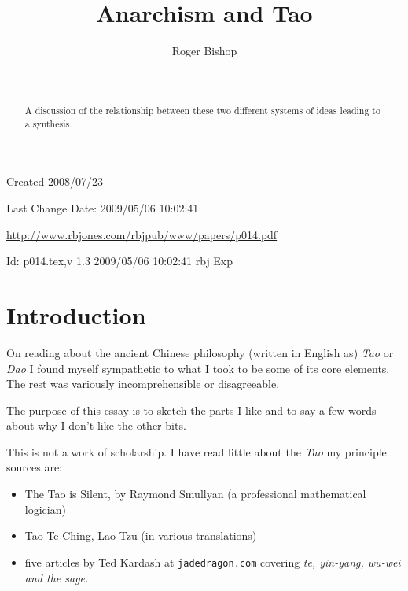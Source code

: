 \documentclass[numreferences]{rbjk}
\def\indexed#1{#1\index{#1}}
\begin{document}
                                                                                   
\begin{article}
\begin{opening}  
\title{Anarchism and Tao}
\author{Roger Bishop }
\date{$ $\ $ $}

\begin{abstract}
A discussion of the relationship between these two different systems of ideas leading to a synthesis.
\end{abstract}

\end{opening}

\vfill

\begin{centering}
\footnotesize{
Created 2008/07/23

Last Change $ $Date: 2009/05/06 10:02:41 $ $

\href{http://www.rbjones.com/rbjpub/www/papers/p014.pdf}{http://www.rbjones.com/rbjpub/www/papers/p014.pdf}

$ $Id: p014.tex,v 1.3 2009/05/06 10:02:41 rbj Exp $ $\\

}%
\end{centering}

\newpage
\setcounter{tocdepth}{4}
{\parskip-0pt\tableofcontents}

\section{Introduction}

On reading about the ancient Chinese philosophy (written in English as) {\it Tao} or {\it Dao} I found myself sympathetic to what I took to be some of its core elements.
The rest was variously incomprehensible or disagreeable.

The purpose of this essay is to sketch the parts I like and to say a few words about why I don't like the other bits.

This is not a work of scholarship.
I have read little about the {\it Tao} my principle sources are:

\begin{itemize}
\item The Tao is Silent\cite{smullyan77}, by Raymond Smullyan (a professional mathematical logician)
\item Tao Te Ching, Lao-Tzu (in various translations)
\item five articles by Ted Kardash at {\tt jadedragon.com} covering \indexed{\it te}, \indexed{\it yin-yang}, \indexed{\it wu-wei} and \indexed{\it the sage}. 
\end{itemize}


\end{article}
\end{document}
